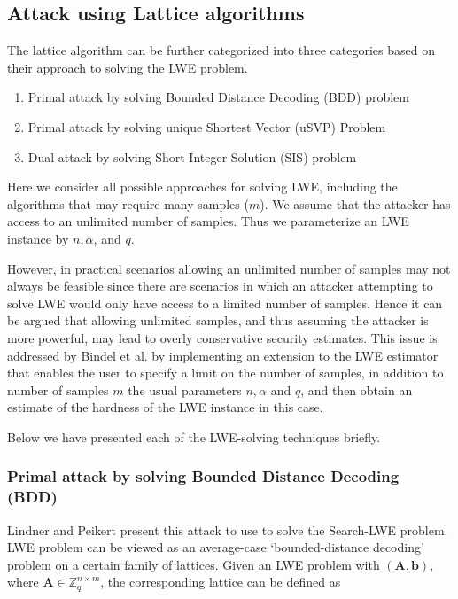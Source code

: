 \subsection{Attack using Lattice algorithms}
The lattice algorithm can be further categorized into three categories based on their approach to solving the LWE problem.
\begin{enumerate}
    \item Primal attack by solving Bounded Distance Decoding (BDD) problem
    \item Primal attack by solving unique Shortest Vector (uSVP) Problem
    \item Dual attack by solving Short Integer Solution (SIS) problem
\end{enumerate}
Here we consider all possible approaches for solving LWE, including the algorithms that may require many samples ($m$). We assume that the attacker has access to an unlimited number of samples. Thus we parameterize an LWE instance by $n,\alpha$, and $q$.

However, in practical scenarios allowing an unlimited number of samples may not always be feasible since there are scenarios in which an attacker attempting to solve LWE would only have access to a limited number of samples. Hence it can be argued that allowing unlimited samples, and thus assuming the attacker is more powerful, may lead to overly conservative security estimates. This issue is addressed by Bindel et al. \cite{bindel2019estimation} by implementing an extension to the LWE estimator \cite{albrechtestimator} that enables the user to specify a limit on the number of samples, in addition to number of samples $m$ the usual parameters $n, \alpha$ and $q$, and then obtain an estimate of the hardness of the LWE instance in this case.

Below we have presented each of the LWE-solving techniques briefly.



\subsubsection{Primal attack by solving Bounded Distance Decoding (BDD)\label{Primal_BDD}}
Lindner and Peikert present this attack \cite{lindner2011better} to use to solve the Search-LWE problem. LWE problem can be viewed as an average-case `bounded-distance decoding' problem on a certain family of lattices. Given an LWE problem with $(\textbf{A},\textbf{b})$, where $\textbf{A} \in \mathbb{Z}^{n\times m}_q$, the corresponding lattice can be defined as


